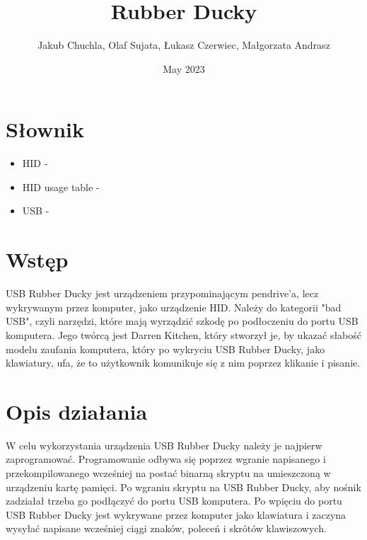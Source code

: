 \documentclass{article}
\title{Rubber Ducky}
\author{Jakub Chuchla, Olaf Sujata, Łukasz Czerwiec, Małgorzata Andrasz}
\date{May 2023}
\begin{document}
\maketitle

\tableofcontents

\section{Słownik}
\begin{itemize}
    \item HID - 
    \item HID usage table -
    \item USB -
\end{itemize}

\section{Wstęp}
USB Rubber Ducky jest urządzeniem przypominającym pendrive'a, lecz wykrywanym przez komputer, jako urządzenie HID. Należy do kategorii "bad USB", czyli narzędzi, które mają wyrządzić szkodę po podłoczeniu do portu USB komputera. Jego twórcą jest Darren Kitchen, który stworzył je, by ukazać słabość modelu zaufania komputera, który po wykryciu USB Rubber Ducky, jako klawiatury, ufa, że to użytkownik komunikuje się z nim poprzez klikanie i pisanie.

\section{Opis działania}
W celu wykorzystania urządzenia USB Rubber Ducky należy je najpierw zaprogramować. Programowanie odbywa się poprzez wgranie napisanego i przekompilowanego wcześniej na postać binarną skryptu na umieszczoną w urządzeniu kartę pamięci. Po wgraniu skryptu na USB Rubber Ducky, aby nośnik zadziałał trzeba go podłączyć do portu USB komputera. Po wpięciu do portu USB Rubber Ducky jest wykrywane przez komputer jako klawiatura i zaczyna wysyłać napisane wcześniej ciągi znaków, poleceń i skrótów klawiszowych.
\end{document}
